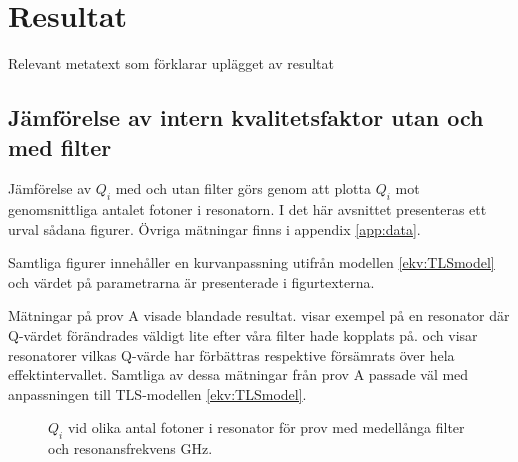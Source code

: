 \documentclass[main.tex]{subfiles}
\begin{document}
\chapter{Resultat}
\label{ch:results}
Relevant metatext som förklarar uplägget av resultat

\section{Jämförelse av intern kvalitetsfaktor utan och med filter}
Jämförelse av $Q_i$ med och utan filter görs genom att plotta $Q_i$ mot genomsnittliga antalet fotoner i resonatorn. I det här avsnittet presenteras ett urval sådana figurer. Övriga mätningar finns i appendix \ref{app:data}.

Samtliga figurer innehåller en kurvanpassning utifrån modellen \ref{ekv:TLSmodel} och värdet på parametrarna är presenterade i figurtexterna.

Mätningar på prov A visade blandade resultat.  visar exempel på en resonator där Q-värdet förändrades väldigt lite efter våra filter hade kopplats på.  och  visar resonatorer vilkas Q-värde har förbättras respektive försämrats över hela effektintervallet. Samtliga av dessa mätningar från prov A passade väl med anpassningen till TLS-modellen \ref{ekv:TLSmodel}.


\begin{figure}[H]
  \centering
  \setlength{}
  \setlength\figureheight{12em}
  
  \caption{$Q_i$ vid olika antal fotoner i resonator för prov med medellånga filter och resonansfrekvens \unit[5,732]{GHz}.}
\end{figure}
\end{document}
